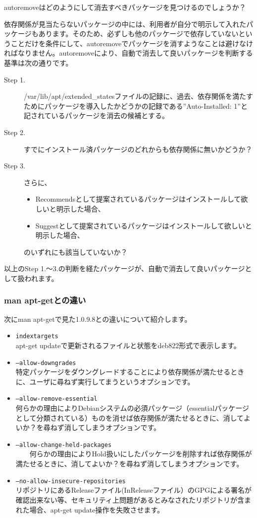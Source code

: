 \documentclass[mingoth,a4paper]{jsarticle}
\begin{document}
 autoremoveはどのようにして消去すべきパッケージを見つけるのでしょうか？

 依存関係が見当たらないパッケージの中には、利用者が自分で明示して入れたパッケージもあります。そのため、必ずしも他のパッケージで依存していないということだけを条件にして、autoremoveでパッケージを消すようなことは避けなければなりません。autoremoveにより、自動で消去して良いパッケージを判断する基準は次の通りです。
 
\begin{description}
 \item [Step 1.] /var/lib/apt/extended\_statesファイルの記録に、過去、依存関係を満たすためにパッケージを導入したかどうかの記録である''Auto-Installed: 1''と記されているパッケージを消去の候補とする。
 \item [Step 2.] すでにインストール済パッケージのどれからも依存関係に無いかどうか？
 \item [Step 3.] さらに、
\begin{itemize}
\item Recommendsとして提案されているパッケージはインストールして欲しいと明示した場合、
\item Suggestとして提案されているパッケージはインストールして欲しいと明示した場合、
\end{itemize}
のいずれにも該当していないか？
\end{description}

以上のStep 1.〜3.の判断を経たパッケージが、自動で消去して良いパッケージとして扱われます。

\subsubsection{man apt-getとの違い}

次にman apt-getで見た1.0.9.8との違いについて紹介します。

 \begin{itemize}
\item \texttt{indextargets} \\
   apt-get updateで更新されるファイルと状態をdeb822形式で表示します。
 \item \texttt{--allow-downgrades} \\
   特定パッケージをダウングレードすることにより依存関係が満たせるときに、ユーザに尋ねず実行してまうというオプションです。
 \item \texttt{--allow-remove-essential} \\
   何らかの理由によりDebianシステムの必須パッケージ（essentialパッケージとして分類されている）ものを消せば依存関係が満たせるときに、消してよいか？を尋ねず消してしまうオプションです。
 \item \texttt{--allow-change-held-packages} \\
　　何らかの理由によりHold扱いにしたパッケージを削除すれば依存関係が満たせるときに、消してよいか？を尋ねず消してしまうオプションです。
　\item \texttt{--no-allow-insecure-repositories} \\
   リポジトリにあるReleaseファイル(InReleaseファイル）のGPGによる署名が確認出来ない等、セキュリティ上問題があるとみなされたリポジトリが含まれた場合、apt-get update操作を失敗させます。
 \end{itemize}
 
\end{document}
